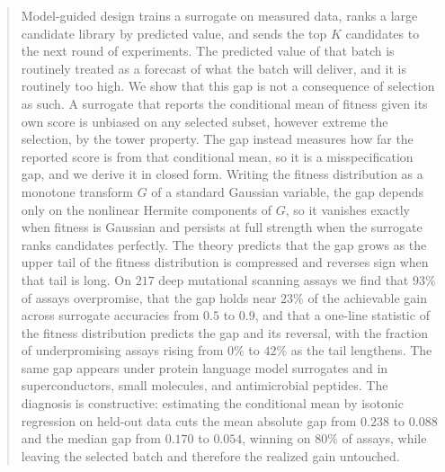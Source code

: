 \documentclass{article}
\theoremstyle{plain}
\theoremstyle{definition}
\begin{document}

\printAffiliationsAndNotice{}

\begin{abstract}
Model-guided design trains a surrogate on measured data, ranks a large candidate
library by predicted value, and sends the top $K$ candidates to the next round of
experiments. The predicted value of that batch is routinely treated as a forecast of
what the batch will deliver, and it is routinely too high. We show that this gap is
not a consequence of selection as such. A surrogate that reports the conditional mean
of fitness given its own score is unbiased on any selected subset, however extreme the
selection, by the tower property. The gap instead measures how far the reported score
is from that conditional mean, so it is a misspecification gap, and we derive it in
closed form. Writing the fitness distribution as a monotone transform $G$ of a standard
Gaussian variable, the gap depends only on the nonlinear Hermite components of $G$, so
it vanishes exactly when fitness is Gaussian and persists at full strength when the
surrogate ranks candidates perfectly. The theory predicts that the gap grows as the
upper tail of the fitness distribution is compressed and reverses sign when that tail
is long. On $217$ deep mutational scanning assays we find that $93\%$ of assays
overpromise, that the gap holds near $23\%$ of the achievable gain across surrogate
accuracies from $0.5$ to $0.9$, and that a one-line statistic of the fitness
distribution predicts the gap and its reversal, with the fraction of underpromising
assays rising from $0\%$ to $42\%$ as the tail lengthens. The same gap appears under
protein language model surrogates and in superconductors, small molecules, and
antimicrobial peptides. The diagnosis is
constructive: estimating the conditional mean by isotonic regression on held-out data
cuts the mean absolute gap from $0.238$ to $0.088$ and the median gap from $0.170$ to
$0.054$, winning on $80\%$ of assays, while leaving the selected batch and therefore
the realized gain untouched.
\end{abstract}
\end{document}
